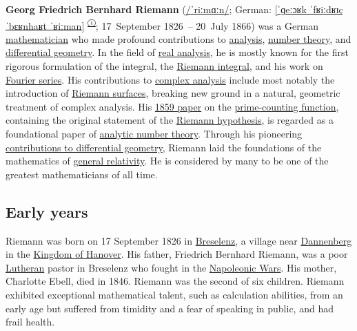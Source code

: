 \textbf{Georg Friedrich Bernhard Riemann} ({\foreignlanguage{english}{\href{https://en.wikipedia.org/wiki/Help:IPA/English}{/{{ˈ}{r}{iː}{m}{ɑː}{n}}/}}}; {German:}{ }\foreignlanguage{ngerman}{\href{https://en.wikipedia.org/wiki/Help:IPA/Standard_German}{{{[}}ˈɡeːɔʁk{ }ˈfʁiːdʁɪç{ }ˈbɛʁnhaʁt{ }ˈʁiːman{{]}}}}{ }{{}\textsuperscript{\href{https://en.wikipedia.org/wiki/File:Georgfriedrichbernhardriemann.ogg}{ⓘ}}}; 17{{~}}September 1826{~}{--}{ }20{{~}}July 1866) was a German \href{https://en.wikipedia.org/wiki/Mathematician}{mathematician} who made profound contributions to \href{https://en.wikipedia.org/wiki/Mathematical_analysis}{analysis}, \href{https://en.wikipedia.org/wiki/Number_theory}{number theory}, and \href{https://en.wikipedia.org/wiki/Differential_geometry}{differential geometry}. In the field of \href{https://en.wikipedia.org/wiki/Real_analysis}{real analysis}, he is mostly known for the first rigorous formulation of the integral, the \href{https://en.wikipedia.org/wiki/Riemann_integral}{Riemann integral}, and his work on \href{https://en.wikipedia.org/wiki/Fourier_series}{Fourier series}. His contributions to \href{https://en.wikipedia.org/wiki/Complex_analysis}{complex analysis} include most notably the introduction of \href{https://en.wikipedia.org/wiki/Riemann_surface}{Riemann surfaces}, breaking new ground in a natural, geometric treatment of complex analysis. His \href{https://en.wikipedia.org/wiki/On_the_Number_of_Primes_Less_Than_a_Given_Magnitude}{1859 paper} on the \href{https://en.wikipedia.org/wiki/Prime-counting_function}{prime-counting function}, containing the original statement of the \href{https://en.wikipedia.org/wiki/Riemann_hypothesis}{Riemann hypothesis}, is regarded as a foundational paper of \href{https://en.wikipedia.org/wiki/Analytic_number_theory}{analytic number theory}. Through his pioneering \href{https://en.wikipedia.org/wiki/Riemannian_Geometry}{contributions to differential geometry}, Riemann laid the foundations of the mathematics of \href{https://en.wikipedia.org/wiki/General_relativity}{general relativity}. He is considered by many to be one of the greatest mathematicians of all time.


\subsection{Early years}\label{Early_years}

Riemann was born on 17 September 1826 in \href{https://en.wikipedia.org/wiki/Breselenz}{Breselenz}, a village near \href{https://en.wikipedia.org/wiki/Dannenberg_(Elbe)}{Dannenberg} in the \href{https://en.wikipedia.org/wiki/Kingdom_of_Hanover}{Kingdom of Hanover}. His father, Friedrich Bernhard Riemann, was a poor \href{https://en.wikipedia.org/wiki/Lutheranism}{Lutheran} pastor in Breselenz who fought in the \href{https://en.wikipedia.org/wiki/Napoleonic_Wars}{Napoleonic Wars}. His mother, Charlotte Ebell, died in 1846. Riemann was the second of six children. Riemann exhibited exceptional mathematical talent, such as calculation abilities, from an early age but suffered from timidity and a fear of speaking in public, and had frail health.


